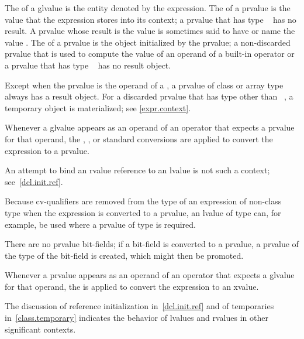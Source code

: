 \pnum
The  of a glvalue is the entity denoted by the expression.
The  of a prvalue
is the value that the expression stores into its context;
a prvalue that has type \cv{}~ has no result.
A prvalue whose result is the value 
is sometimes said to have or name the value .
The  of a prvalue is the object initialized by the prvalue;
a non-discarded prvalue
that is used to compute the value of an operand of a built-in operator
or a prvalue that has type \cv{}~
has no result object.
\begin{note}
Except when the prvalue is the operand of a ,
a prvalue of class or array type always has a result object.
For a discarded prvalue that has type other than \cv{}~,
a temporary object is materialized; see \ref{expr.context}.
\end{note}

\pnum
Whenever a glvalue appears as an operand of an operator that
expects a prvalue for that operand, the
, ,
or  standard conversions are
applied to convert the expression to a prvalue.
\begin{note}
An attempt to bind an rvalue reference to an lvalue is not such a context; see~\ref{dcl.init.ref}.
\end{note}
\begin{note}
Because cv-qualifiers are removed from the type of an expression of
non-class type when the expression is converted to a prvalue, an lvalue
of type  can, for example, be used where
a prvalue of type  is required.
\end{note}
\begin{note}
There are no prvalue bit-fields; if a bit-field is converted to a
prvalue, a prvalue of the type of the bit-field is
created, which might then be promoted.
\end{note}

\pnum
Whenever a prvalue appears as an operand of an operator that
expects a glvalue for that operand, the
 is
applied to convert the expression to an xvalue.

\pnum
The discussion of reference initialization in~\ref{dcl.init.ref} and of
temporaries in~\ref{class.temporary} indicates the behavior of lvalues
and rvalues in other significant contexts.

